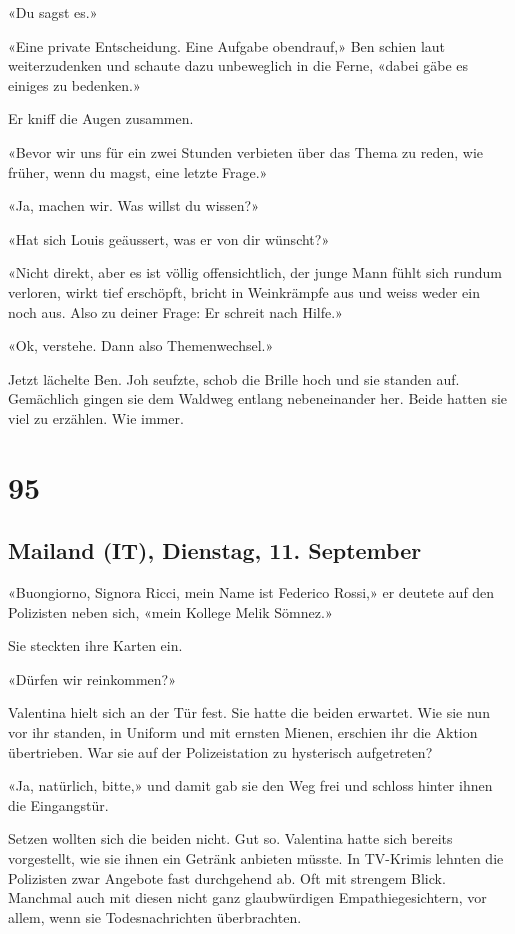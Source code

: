 «Du sagst es.»

«Eine private Entscheidung. Eine Aufgabe obendrauf,» Ben schien laut
weiterzudenken und schaute dazu unbeweglich in die Ferne, «dabei gäbe es
einiges zu bedenken.»

Er kniff die Augen zusammen.

«Bevor wir uns für ein zwei Stunden verbieten über das Thema zu reden,
wie früher, wenn du magst, eine letzte Frage.»

«Ja, machen wir. Was willst du wissen?»

«Hat sich Louis geäussert, was er von dir wünscht?»

«Nicht direkt, aber es ist völlig offensichtlich, der junge Mann fühlt
sich rundum verloren, wirkt tief erschöpft, bricht in Weinkrämpfe aus
und weiss weder ein noch aus. Also zu deiner Frage: Er schreit nach
Hilfe.»

«Ok, verstehe. Dann also Themenwechsel.»

Jetzt lächelte Ben. Joh seufzte, schob die Brille hoch und sie standen
auf. Gemächlich gingen sie dem Waldweg entlang nebeneinander her. Beide
hatten sie viel zu erzählen. Wie immer.

\chapter{95}\label{section-95}

\section{Mailand (IT), Dienstag, 11.
September}\label{mailand-it-dienstag-11.-september}

«Buongiorno, Signora Ricci, mein Name ist Federico Rossi,» er deutete
auf den Polizisten neben sich, «mein Kollege Melik Sömnez.»

Sie steckten ihre Karten ein.

«Dürfen wir reinkommen?»

Valentina hielt sich an der Tür fest. Sie hatte die beiden erwartet. Wie
sie nun vor ihr standen, in Uniform und mit ernsten Mienen, erschien ihr
die Aktion übertrieben. War sie auf der Polizeistation zu hysterisch
aufgetreten?

«Ja, natürlich, bitte,» und damit gab sie den Weg frei und schloss
hinter ihnen die Eingangstür.

Setzen wollten sich die beiden nicht. Gut so. Valentina hatte sich
bereits vorgestellt, wie sie ihnen ein Getränk anbieten müsste. In
TV-Krimis lehnten die Polizisten zwar Angebote fast durchgehend ab. Oft
mit strengem Blick. Manchmal auch mit diesen nicht ganz glaubwürdigen
Empathiegesichtern, vor allem, wenn sie Todesnachrichten überbrachten.

